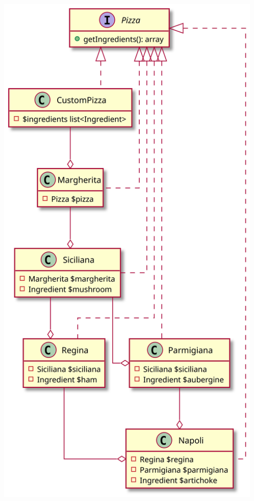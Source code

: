 \begin{frame}[fragile,c]
    \begin{center}
        \includegraphics[height=\textheight]{src/session--composition-and-inheritance/resources/summary-composition-pizza.png}
    \end{center}
\end{frame}


